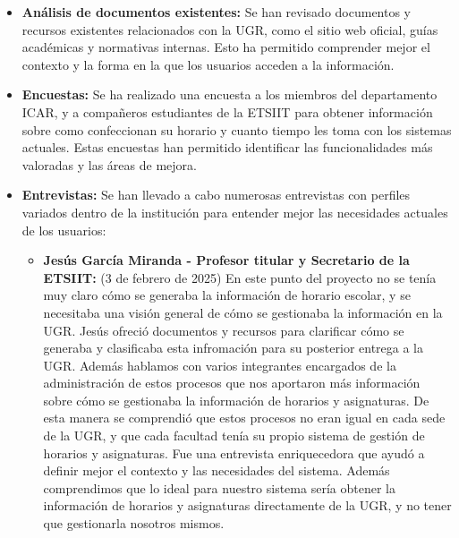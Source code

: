 \begin{itemize}
    \item \textbf{Análisis de documentos existentes:} Se han revisado documentos y recursos existentes relacionados con la UGR, como el sitio web oficial, guías académicas y normativas internas. Esto ha permitido comprender mejor el contexto y la forma en la que los usuarios acceden a la información.
    \item \textbf{Encuestas:} Se ha realizado una encuesta a los miembros del departamento ICAR, y a compañeros estudiantes de la ETSIIT para obtener información sobre como confeccionan su horario y cuanto tiempo les toma con los sistemas actuales. Estas encuestas han permitido identificar las funcionalidades más valoradas y las áreas de mejora.
    \item \textbf{Entrevistas:} Se han llevado a cabo numerosas entrevistas con perfiles variados dentro de la institución para entender mejor las necesidades actuales de los usuarios:
    \begin{itemize}
        \item \textbf{Jesús García Miranda - Profesor titular y Secretario de la ETSIIT:} (3 de febrero de 2025) En este punto del proyecto no se tenía muy claro cómo se generaba la información de horario escolar, y se necesitaba una visión general de cómo se gestionaba la información en la UGR. \newline
        Jesús ofreció documentos y recursos para clarificar cómo se generaba y clasificaba esta infromación para su posterior entrega a la UGR. Además hablamos con varios integrantes encargados de la administración de estos procesos que nos aportaron más información sobre cómo se gestionaba la información de horarios y asignaturas.
        De esta manera se comprendió que estos procesos no eran igual en cada sede de la UGR, y que cada facultad tenía su propio sistema de gestión de horarios y asignaturas. \newline
        Fue una entrevista enriquecedora que ayudó a definir mejor el contexto y las necesidades del sistema. Además comprendimos que lo ideal para nuestro sistema sería obtener la información de horarios y asignaturas directamente de la UGR, y no tener que gestionarla nosotros mismos. \newline


\end{itemize}
\end{itemize}
